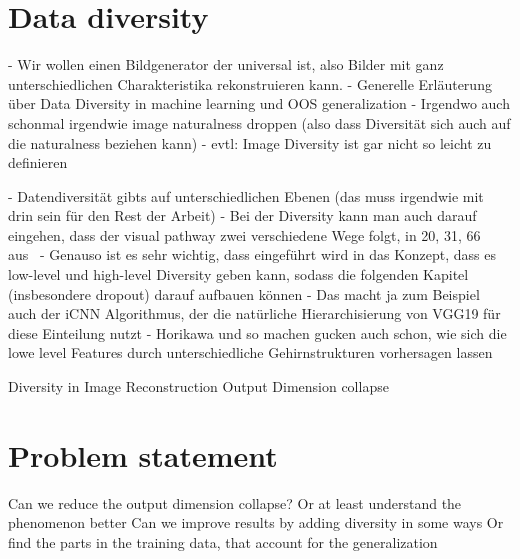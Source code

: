 \section{Data diversity}
- Wir wollen einen Bildgenerator der universal ist, also Bilder mit ganz unterschiedlichen Charakteristika rekonstruieren kann.
- Generelle Erläuterung über Data Diversity in machine learning und OOS generalization
- Irgendwo auch schonmal irgendwie image naturalness droppen (also dass Diversität sich auch auf die naturalness beziehen kann)
- evtl: Image Diversity ist gar nicht so leicht zu definieren

- Datendiversität gibts auf unterschiedlichen Ebenen (das muss irgendwie mit drin sein für den Rest der Arbeit)
- Bei der Diversity kann man auch darauf eingehen, dass der visual pathway zwei verschiedene Wege folgt, in 20, 31, 66 aus~\cite{chenExploringNaturalnessAIGenerated2023}
    - Genauso ist es sehr wichtig, dass eingeführt wird in das Konzept, dass es low-level und high-level Diversity geben kann, sodass die folgenden Kapitel (insbesondere dropout) darauf aufbauen können
    - Das macht ja zum Beispiel auch der iCNN Algorithmus, der die natürliche Hierarchisierung von VGG19 für diese Einteilung nutzt
    - Horikawa und so machen gucken auch schon, wie sich die lowe level Features durch unterschiedliche Gehirnstrukturen vorhersagen lassen

Diversity in Image Reconstruction 
    Output Dimension collapse~\cite{shirakawaSpuriousReconstructionBrain2024}


\section{Problem statement}
Can we reduce the output dimension collapse?
    Or at least understand the phenomenon better
Can we improve results by adding diversity in some ways
    Or find the parts in the training data, that account for the generalization